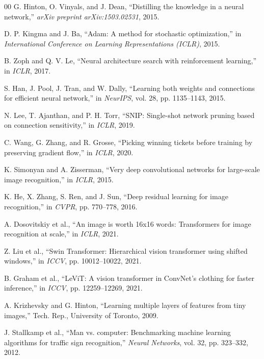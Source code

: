 \documentclass[11pt, conference]{IEEEtran}
\begin{document}
\begin{thebibliography}{00}
G. Hinton, O. Vinyals, and J. Dean, ``Distilling the knowledge in a neural network,'' \textit{arXiv preprint arXiv:1503.02531}, 2015.

D. P. Kingma and J. Ba, ``Adam: A method for stochastic optimization,'' in \textit{International Conference on Learning Representations (ICLR)}, 2015.

B. Zoph and Q. V. Le, ``Neural architecture search with reinforcement learning,'' in \textit{ICLR}, 2017.

S. Han, J. Pool, J. Tran, and W. Dally, ``Learning both weights and connections for efficient neural network,'' in \textit{NeurIPS}, vol. 28, pp. 1135--1143, 2015.

N. Lee, T. Ajanthan, and P. H. Torr, ``SNIP: Single-shot network pruning based on connection sensitivity,'' in \textit{ICLR}, 2019.

C. Wang, G. Zhang, and R. Grosse, ``Picking winning tickets before training by preserving gradient flow,'' in \textit{ICLR}, 2020.

K. Simonyan and A. Zisserman, ``Very deep convolutional networks for large-scale image recognition,'' in \textit{ICLR}, 2015.

K. He, X. Zhang, S. Ren, and J. Sun, ``Deep residual learning for image recognition,'' in \textit{CVPR}, pp. 770--778, 2016.

A. Dosovitskiy et al., ``An image is worth 16x16 words: Transformers for image recognition at scale,'' in \textit{ICLR}, 2021.

Z. Liu et al., ``Swin Transformer: Hierarchical vision transformer using shifted windows,'' in \textit{ICCV}, pp. 10012--10022, 2021.

B. Graham et al., ``LeViT: A vision transformer in ConvNet's clothing for faster inference,'' in \textit{ICCV}, pp. 12259--12269, 2021.

A. Krizhevsky and G. Hinton, ``Learning multiple layers of features from tiny images,'' Tech. Rep., University of Toronto, 2009.

J. Stallkamp et al., ``Man vs. computer: Benchmarking machine learning algorithms for traffic sign recognition,'' \textit{Neural Networks}, vol. 32, pp. 323--332, 2012.


\end{thebibliography}
\end{document}
